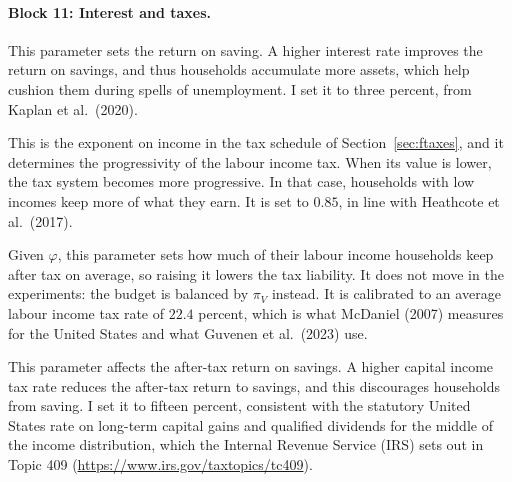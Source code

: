 \documentclass[10pt]{article}
\begin{document}
\paragraph{Block 11: Interest and taxes.}
\begin{description}\setlength{\itemsep}{0.25em}\setlength{\parskip}{0em}
\item[$r$, the risk-free rate.] This parameter sets the return on saving.   A higher interest rate improves the return on savings, and thus households accumulate more assets, which help cushion them during spells of unemployment. I set it to three percent, from Kaplan et al.\
(2020).

\item[$\varphi$, tax progressivity.] This is the exponent on income in the tax schedule of
Section~\ref{sec:ftaxes}, and it determines the progressivity of the labour income tax.   When its value is lower, the tax system becomes more progressive. In that case, households with low incomes keep more of what they earn. It is set to $0.85$, in line with Heathcote et al.\ (2017). 

\item[$\tau_{\ell}$, the scale of after-tax labour income.] Given $\varphi$, this parameter sets how much
of their labour income households keep after tax on average, so raising it lowers the tax liability. It does not move in the experiments: the budget is
balanced by $\pi_V$ instead. It is calibrated to
an average labour income tax rate of $22.4$ percent,
which is what McDaniel (2007) measures for the United States and what Guvenen et al.\ (2023) use.

\item[$\tau_k$, the capital income tax rate.] This parameter affects the after-tax return on savings.   A higher capital income tax rate reduces the after-tax return to savings, and this discourages households from saving. I set it to fifteen percent, consistent
with the statutory United States rate on long-term capital gains and qualified
dividends for the middle of the income distribution, which the Internal Revenue
Service (IRS) sets out in Topic 409
(\url{https://www.irs.gov/taxtopics/tc409}).

\end{description}
\end{document}
